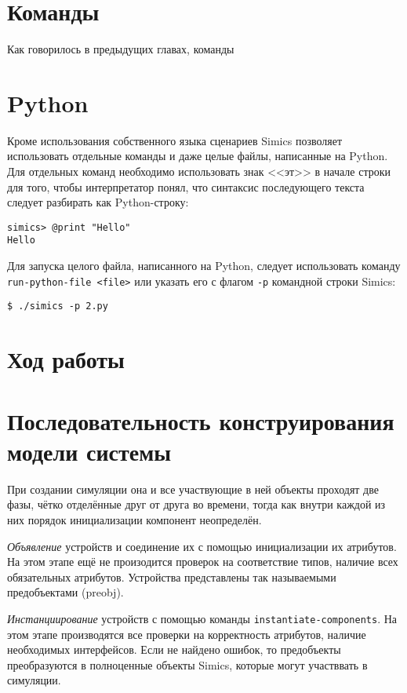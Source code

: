 \section{Команды}

Как говорилось в предыдущих главах, команды 

\todo

\section{Python}

Кроме использования собственного языка сценариев Simics позволяет использовать отдельные команды и даже целые файлы, написанные на Python. Для отдельных команд необходимо использовать знак <<эт>>  в начале строки для того, чтобы интерпретатор понял, что синтаксис последующего текста следует разбирать как Python-строку:
\begin{lstlisting}
simics> @print "Hello"
Hello
\end{lstlisting}

Для запуска целого файла, написанного на Python, следует использовать команду \texttt{run-python-file <file>} или указать его с флагом \texttt{-p} командной строки Simics:
\begin{lstlisting}
$ ./simics -p 2.py
\end{lstlisting}

\section{Ход работы}

\todo 


\section{Последовательность конструирования модели системы}

При создании симуляции она и все участвующие в ней объекты проходят две фазы, чётко отделённые друг от друга во времени, тогда как внутри каждой из них порядок инициализации компонент неопределён.

\begin{enumerate*}

\item \textit{Объявление} устройств и соединение их с помощью инициализации их атрибутов. На этом этапе ещё не произодится проверок на соответствие типов, наличие всех обязательных атрибутов. Устройства представлены так называемыми предобъектами (\abbr preobj).

\item \textit{Инстанциирование} устройств с помощью команды \texttt{instantiate-components}. На этом этапе производятся все проверки на корректность атрибутов, наличие необходимых интерфейсов. Если не найдено ошибок, то предобъекты преобразуются в полноценные объекты Simics, которые могут участввать в симуляции.

\end{enumerate*}

